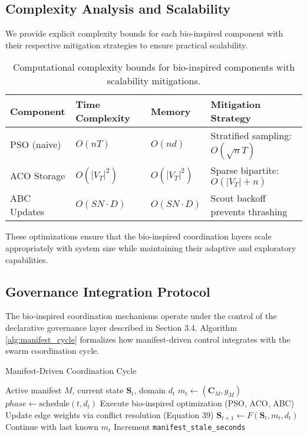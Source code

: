 \documentclass{article}
\begin{document}
\subsection{Complexity Analysis and Scalability}

We provide explicit complexity bounds for each bio-inspired component with their respective mitigation strategies to ensure practical scalability.

\begin{table}[h]
\centering
\caption{Computational complexity bounds for bio-inspired components with scalability mitigations.}
\begin{tabular}{llll}
\hline
\textbf{Component} & \textbf{Time Complexity} & \textbf{Memory} & \textbf{Mitigation Strategy} \\
\hline
PSO (naive) & $O(nT)$ & $O(nd)$ & Stratified sampling: $O(\sqrt{n}T)$ \\
ACO Storage & $O(|V_T|^2)$ & $O(|V_T|^2)$ & Sparse bipartite: $O(|V_T| + n)$ \\
ABC Updates & $O(SN \cdot D)$ & $O(SN \cdot D)$ & Scout backoff prevents thrashing \\
\hline
\end{tabular}
\label{tab:bio_complexity}
\end{table}

These optimizations ensure that the bio-inspired coordination layers scale appropriately with system size while maintaining their adaptive and exploratory capabilities.

\subsection{Governance Integration Protocol}

The bio-inspired coordination mechanisms operate under the control of the declarative governance layer described in Section 3.4. Algorithm \ref{alg:manifest_cycle} formalizes how manifest-driven control integrates with the swarm coordination cycle.

\begin{algorithm}[H]
\caption{Manifest-Driven Coordination Cycle}
\label{alg:manifest_cycle}
\begin{algorithmic}[1]
\REQUIRE Active manifest $M$, current state $\mathbf{S}_t$, domain $d_t$
\STATE $m_t \gets (\mathbf{C}_M, g_M)$ 
\STATE $phase \gets \text{schedule}(t, d_t)$ 
    \STATE Execute bio-inspired optimization (PSO, ACO, ABC) 
    \STATE Update edge weights via conflict resolution (Equation 39)
\ENDIF
\STATE $\mathbf{S}_{t+1} \gets F(\mathbf{S}_t, m_t, d_t)$ 
    \STATE Continue with last known $m_t$ 
    \STATE Increment \texttt{manifest\_stale\_seconds}
\ENDIF
\end{algorithmic}
\end{algorithm}
\end{document}
